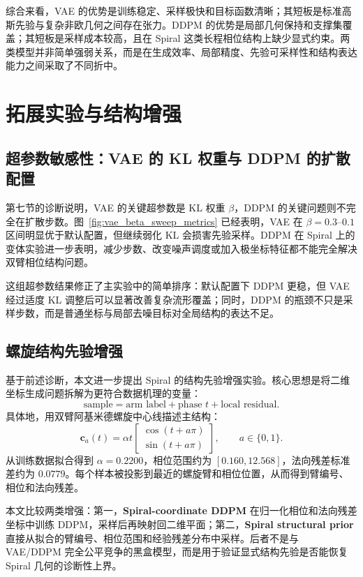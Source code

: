 \documentclass[10pt, a4paper, oneside]{ctexart}
\numberwithin{equation}{section}
\numberwithin{table}{section}
\numberwithin{figure}{section}
\newcommand{\vect}[1]{\mathbf{#1}}
\begin{document}
综合来看，VAE 的优势是训练稳定、采样极快和目标函数清晰；其短板是标准高斯先验与复杂非欧几何之间存在张力。DDPM 的优势是局部几何保持和支撑集覆盖；其短板是采样成本较高，且在 Spiral 这类长程相位结构上缺少显式约束。两类模型并非简单强弱关系，而是在生成效率、局部精度、先验可采样性和结构表达能力之间采取了不同折中。

\section{拓展实验与结构增强}

\subsection{超参数敏感性：VAE 的 KL 权重与 DDPM 的扩散配置}

第七节的诊断说明，VAE 的关键超参数是 KL 权重 $\beta$，DDPM 的关键问题则不完全在扩散步数。图~\ref{fig:vae_beta_sweep_metrics} 已经表明，VAE 在 $\beta=0.3$--$0.1$ 区间明显优于默认配置，但继续弱化 KL 会损害先验采样。DDPM 在 Spiral 上的变体实验进一步表明，减少步数、改变噪声调度或加入极坐标特征都不能完全解决双臂相位结构问题。

这组超参数结果修正了主实验中的简单排序：默认配置下 DDPM 更稳，但 VAE 经过适度 KL 调整后可以显著改善复杂流形覆盖；同时，DDPM 的瓶颈不只是采样步数，而是普通坐标与局部去噪目标对全局结构的表达不足。

\subsection{螺旋结构先验增强}

基于前述诊断，本文进一步提出 Spiral 的结构先验增强实验。核心思想是将二维坐标生成问题拆解为更符合数据机理的变量：
\[
    \text{sample} = \text{arm label} + \text{phase } t + \text{local residual}.
\]
具体地，用双臂阿基米德螺旋中心线描述主结构：
\begin{equation}
    \vect{c}_a(t)=\alpha t
    \begin{bmatrix}
    \cos(t+a\pi)\\
    \sin(t+a\pi)
    \end{bmatrix},
    \qquad a\in\{0,1\}.
\end{equation}
从训练数据拟合得到 $\alpha=0.2200$，相位范围约为 $[0.160,12.568]$，法向残差标准差约为 $0.0779$。每个样本被投影到最近的螺旋臂和相位位置，从而得到臂编号、相位和法向残差。

本文比较两类增强：第一，\textbf{Spiral-coordinate DDPM} 在归一化相位和法向残差坐标中训练 DDPM，采样后再映射回二维平面；第二，\textbf{Spiral structural prior} 直接从拟合的臂编号、相位范围和经验残差分布中采样。后者不是与 VAE/DDPM 完全公平竞争的黑盒模型，而是用于验证显式结构先验是否能恢复 Spiral 几何的诊断性上界。
\end{document}
